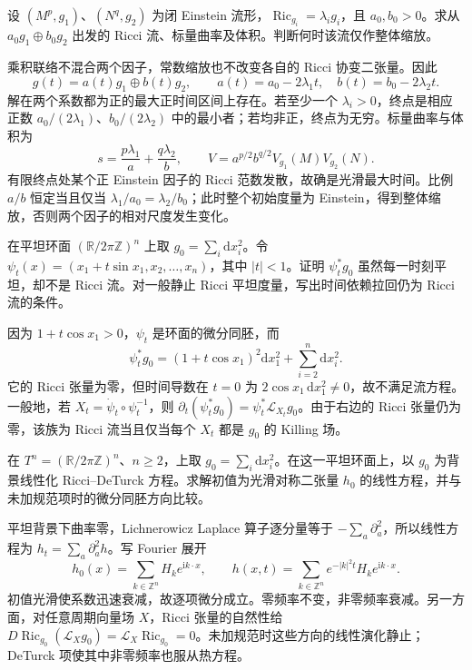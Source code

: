 \BookExercises

\begin{exercise}\label{g3:ex:ricci-einstein-products}
设 \((M^p,g_1)\)、\((N^q,g_2)\) 为闭 Einstein 流形，\(\operatorname{Ric}_{g_i}=\lambda_i g_i\)，且 \(a_0,b_0>0\)。求从 \(a_0g_1\oplus b_0g_2\) 出发的 Ricci 流、标量曲率及体积。判断何时该流仅作整体缩放。
\end{exercise}
\begin{solution}
乘积联络不混合两个因子，常数缩放也不改变各自的 Ricci 协变二张量。因此
\[
g(t)=a(t)g_1\oplus b(t)g_2,\qquad
a(t)=a_0-2\lambda_1t,\quad b(t)=b_0-2\lambda_2t.
\]
解在两个系数都为正的最大正时间区间上存在。若至少一个 \(\lambda_i>0\)，终点是相应正数 \(a_0/(2\lambda_1)\)、\(b_0/(2\lambda_2)\) 中的最小者；若均非正，终点为无穷。标量曲率与体积为
\[
s=\frac{p\lambda_1}{a}+\frac{q\lambda_2}{b},\qquad
V=a^{p/2}b^{q/2}V_{g_1}(M)V_{g_2}(N).
\]
有限终点处某个正 Einstein 因子的 Ricci 范数发散，故确是光滑最大时间。比例 \(a/b\) 恒定当且仅当 \(\lambda_1/a_0=\lambda_2/b_0\)；此时整个初始度量为 Einstein，得到整体缩放，否则两个因子的相对尺度发生变化。
\end{solution}

\begin{exercise}\label{g3:ex:ricci-time-reparametrization}
在平坦环面 \((\mathbb R/2\pi\mathbb Z)^n\) 上取 \(g_0=\sum_i\mathrm dx_i^2\)。令 \(\psi_t(x)=(x_1+t\sin x_1,x_2,\ldots,x_n)\)，其中 \(|t|<1\)。证明 \(\psi_t^*g_0\) 虽然每一时刻平坦，却不是 Ricci 流。对一般静止 Ricci 平坦度量，写出时间依赖拉回仍为 Ricci 流的条件。
\end{exercise}
\begin{solution}
因为 \(1+t\cos x_1>0\)，\(\psi_t\) 是环面的微分同胚，而
\[
\psi_t^*g_0=(1+t\cos x_1)^2\mathrm dx_1^2+\sum_{i=2}^n\mathrm dx_i^2.
\]
它的 Ricci 张量为零，但时间导数在 \(t=0\) 为 \(2\cos x_1\,\mathrm dx_1^2\ne0\)，故不满足流方程。一般地，若 \(X_t=\dot\psi_t\circ\psi_t^{-1}\)，则 \(\partial_t(\psi_t^*g_0)=\psi_t^*\mathcal L_{X_t}g_0\)。由于右边的 Ricci 张量仍为零，该族为 Ricci 流当且仅当每个 \(X_t\) 都是 \(g_0\) 的 Killing 场。
\end{solution}

\begin{exercise}\label{g3:ex:ricci-flat-linearization}
在 \(T^n=(\mathbb R/2\pi\mathbb Z)^n\)、\(n\ge2\)，上取 \(g_0=\sum_i\mathrm dx_i^2\)。在这一平坦环面上，以 \(g_0\) 为背景线性化 Ricci--DeTurck 方程。求解初值为光滑对称二张量 \(h_0\) 的线性方程，并与未加规范项时的微分同胚方向比较。
\end{exercise}
\begin{solution}
平坦背景下曲率零，Lichnerowicz Laplace 算子逐分量等于 \(-\sum_a\partial_a^2\)，所以线性方程为 \(h_t=\sum_a\partial_a^2h\)。写 Fourier 展开
\[
h_0(x)=\sum_{k\in\mathbb Z^n}H_k e^{\mathrm i k\cdot x},\qquad
h(x,t)=\sum_{k\in\mathbb Z^n}e^{-|k|^2t}H_k e^{\mathrm i k\cdot x}.
\]
初值光滑使系数迅速衰减，故逐项微分成立。零频率不变，非零频率衰减。另一方面，对任意周期向量场 \(X\)，Ricci 张量的自然性给 \(D\operatorname{Ric}_{g_0}(\mathcal L_Xg_0)=\mathcal L_X\operatorname{Ric}_{g_0}=0\)。未加规范时这些方向的线性演化静止；DeTurck 项使其中非零频率也服从热方程。
\end{solution}

